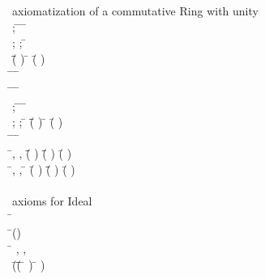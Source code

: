 \begin{hetcasl}
\> {\small{}\KW{\%\%} axiomatization of a commutative Ring with unity}\\
\> \Ax{\forall}  \Ax{:} ; \= \Ax{:}  \Ax{\bullet} \= \Ax{+}  \Ax{=} \= \Ax{+} \\
\> \Ax{\forall}  \Ax{:} ;  \Ax{:} ; \= \Ax{:}  \\
\> \Ax{\bullet} \=(\= \Ax{+} ) \Ax{+}  \Ax{=} \= \Ax{+} (\= \Ax{+} )\\
\> \Ax{\forall} \= \Ax{:}  \Ax{\bullet} \= \Ax{+}  \Ax{=}  \Ax{\wedge} \= \Ax{+}  \Ax{=} \\
\> \Ax{\forall} \= \Ax{:}  \Ax{\bullet} \=\Ax{\exists}  \Ax{:}  \Ax{\bullet} \= \Ax{+}  \Ax{=} \\
\> \Ax{\forall}  \Ax{:} ; \= \Ax{:}  \Ax{\bullet} \= \Ax{*}  \Ax{=} \= \Ax{*} \\
\> \Ax{\forall}  \Ax{:} ;  \Ax{:} ; \= \Ax{:}  \Ax{\bullet} \=(\= \Ax{*} ) \Ax{*}  \Ax{=} \= \Ax{*} (\= \Ax{*} )\\
\> \Ax{\forall} \= \Ax{:}  \Ax{\bullet} \= \Ax{*}  \Ax{=}  \Ax{\wedge} \= \Ax{*}  \Ax{=} \\
\> \Ax{\forall} \=, ,  \Ax{:}  \Ax{\bullet} \=(\= \Ax{+} ) \Ax{*}  \Ax{=} \=(\= \Ax{*} ) \Ax{+} (\= \Ax{*} )\\
\> \Ax{\forall} \=, ,  \Ax{:}  \Ax{\bullet} \= \Ax{*} (\= \Ax{+} ) \Ax{=} \=(\= \Ax{*} ) \Ax{+} (\= \Ax{*} )\\
\> \\
\> {\small{}\KW{\%\%}axioms for Ideal}\\
\> \Ax{\forall} \= \Ax{:}  \\
\> \Ax{\bullet} \=() \\
\>\> \Ax{\Leftrightarrow} \=\Ax{\forall} , ,  \Ax{:}  \\
\>\>\> \Ax{\bullet} \=(\=(\=   \Ax{\Rightarrow} \=  ) \Ax{\wedge} \=  ) \\

\end{hetcasl}
